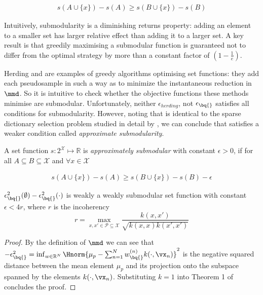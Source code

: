 \begin{align}
s(A\cup\{x\})-s(A)\geq s(B\cup\{x\})-s(B)
\end{align}

Intuitively, submodularity is a diminishing returns property: adding an element to a smaller set has larger relative effect than adding it to a larger set. A key result \cite[see e.\,g.\ ][and references therein]{KrauseCevher10} is that greedily maximising a submodular function is guaranteed not to differ from the optimal strategy by more than a constant factor of $(1-\frac{1}{e})$.

Herding and \sbq{} are examples of greedy algorithms optimising set functions: they add each pseudosample in such a way as to minimize the instantaneous reduction in $\mmd$. So it is intuitive to check whether the objective functions these methods minimise are submodular. Unfortunately, neither $\epsilon_{herding}$, not $\epsilon_{\bq{}}$ satisfies all conditions for submodularity. However, noting that \sbq{} is identical to the sparse dictionary selection problem studied in detail by \citet{KrauseCevher10}, we can conclude that \sbq{} satisfies a weaker condition called \emph{approximate submodularity}. 

A set function $s:2^\mathcal{X} \mapsto \mathbb{R}$ is \textit{approximately submodular} with constant $\epsilon>0$, if for all $A\subseteq B\subseteq \mathcal{X}$ and $\forall x \in \mathcal{X}$

\begin{align}
s(A\cup\{x\})-s(A)\geq s(B\cup\{x\})-s(B) - \epsilon
\end{align}

\begin{proposition}\label{proposition:submodularity_SBQ}
$\epsilon^{2}_{\bq{}}(\emptyset)-\epsilon^{2}_{\bq{}}(\cdot)$ is weakly a weakly submodular set function with constant $\epsilon<4r$, where $r$ is the incoherency
\begin{equation}
	r = \max_{x,x'\in\mathcal{P}\subseteq\mathcal{X}} \frac{k(x,x')}{\sqrt{k(x,x)k(x',x')}}
\end{equation}
\end{proposition}
\begin{proof} By the definition of $\mmd$ we can see that
$-\epsilon^{2}_{\bq{}} = \inf_{w\in\mathbb{R}^N}\Hnorm{\mu_p - \sum_{n=1}^N w^{(n)}_{\bq{}}k(\cdot,\vx_n)}^2$ is the negative squared distance between the mean element $\mu_p$ and its projection onto the subspace spanned by the elements $k(\cdot,\vx_n)$. Substituting $k=1$ into Theorem 1 of \citet{KrauseCevher10} concludes the proof.
\end{proof}

